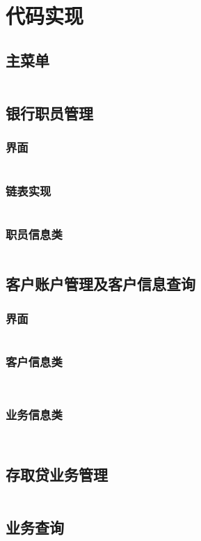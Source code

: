 \documentclass{ctexrep}
\begin{document}
\chapter{代码实现}
\section{主菜单}
\inputminted{cpp}{../src/core/page/meun.cpp}
\section{银行职员管理}
\subsection{界面}
\inputminted{cpp}{../src/core/page/staff_manager.cpp}
\subsection{链表实现}
\inputminted{cpp}{../src/core/data/struct/linkedlist.h}
\subsection{职员信息类}
\inputminted{cpp}{../src/core/data/Staff.h}
\section{客户账户管理及客户信息查询}
\subsection{界面}
\inputminted{cpp}{../src/core/page/custom_account.cpp}
\subsection{客户信息类}
\inputminted{cpp}{../src/core/data/Customer.h}
\inputminted{cpp}{../src/core/data/Customer.cpp}
\subsection{业务信息类}
\inputminted{cpp}{../src/core/data/Transaction.h}
\inputminted{cpp}{../src/core/data/Transaction.cpp}
\section{存取贷业务管理}
\inputminted{cpp}{../src/core/page/cash_reception.cpp}
\section{业务查询}
\inputminted{cpp}{../src/core/page/transaction_query.cpp}
\end{document}
